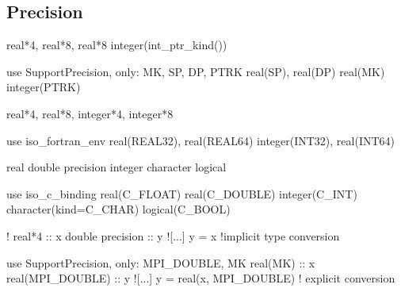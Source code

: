 \documentclass{article}
\begin{document}
\subsection{Precision}
\label{sec:precision}

\begin{codea}

real*4, real*8, 
real*8
integer(int_ptr_kind())
\end{codea}
\begin{codeb}
use SupportPrecision, only: MK, SP, DP, PTRK
real(SP), real(DP)
real(MK)
integer(PTRK)

\end{codeb}
\begin{codea}

real*4, real*8, 
integer*4, integer*8
\end{codea} 
\begin{codeb}
use iso_fortran_env
real(REAL32), real(REAL64)
integer(INT32), real(INT64)
\end{codeb}
\begin{codea}

real
double precision
integer
character
logical
\end{codea}
\begin{codeb}
use iso_c_binding
real(C_FLOAT)
real(C_DOUBLE)
integer(C_INT)
character(kind=C_CHAR)
logical(C_BOOL)
\end{codeb}
\begin{codea}
!
real*4           :: x
double precision :: y
![...]
y = x  !implicit type conversion
\end{codea} 
\begin{codeb}
use SupportPrecision, only: MPI_DOUBLE, MK
real(MK)         :: x
real(MPI_DOUBLE) :: y
![...]
y = real(x, MPI_DOUBLE) ! explicit conversion 
\end{codeb}
\end{document}
